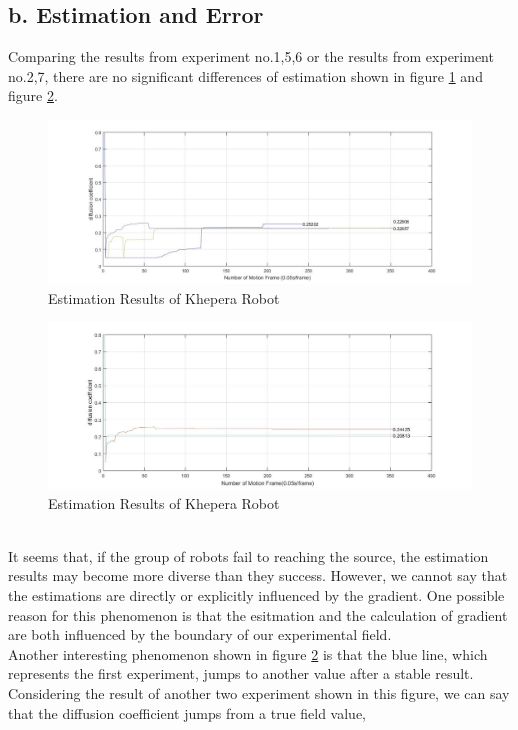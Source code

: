 \documentclass{article}
\begin{document}
\subsection*{b. Estimation and Error}
Comparing the results from experiment no.1,5,6 or the results from experiment no.2,7, there are no significant differences of estimation 
shown in figure \ref{figEstGood} and figure \ref{figEstPoor}. 
\begin{figure}[htbp]
\centering
\includegraphics[width=12cm]{EstimationresultGood} 
\caption{Estimation Results of Khepera Robot}\label{figEstGood}
\end{figure}
\begin{figure}[htbp]
\centering
\includegraphics[width=12cm]{EstimationresultPoor} 
\caption{Estimation Results of Khepera Robot}\label{figEstPoor}
\end{figure}
\\
It seems that, if the group of robots fail to reaching the source, the estimation results may become more diverse than they success. 
However, we cannot say that the estimations are directly or explicitly influenced by the gradient. 
One possible reason for this phenomenon is that the esitmation and the calculation of gradient are both influenced by the boundary of our experimental field. \\
Another interesting phenomenon shown in figure \ref{figEstPoor} is that 
the blue line, which represents the first experiment, jumps to another value after a stable result. 
Considering the result of another two experiment shown in this figure, we can say that the diffusion coefficient jumps from a true field value, 
\end{document}
